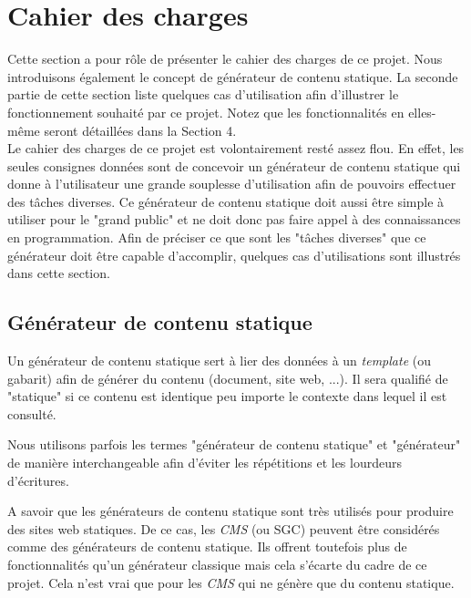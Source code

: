 \section{Cahier des charges}

	Cette section a pour rôle de présenter le cahier des charges de ce projet. Nous introduisons également le concept de générateur de contenu statique. La seconde partie de cette section liste quelques cas d'utilisation afin d'illustrer le fonctionnement souhaité par ce projet. Notez que les fonctionnalités en elles-même seront détaillées dans la Section 4.\\
	
	Le cahier des charges de ce projet est volontairement resté assez flou. En effet, les seules consignes données sont de concevoir un générateur de contenu statique qui donne à l'utilisateur une grande souplesse d'utilisation afin de pouvoirs effectuer des tâches diverses. Ce générateur de contenu statique doit aussi être simple à utiliser pour le "grand public" et ne doit donc pas faire appel à des connaissances en programmation. Afin de préciser ce que sont les "tâches diverses" que ce générateur doit être capable d'accomplir, quelques cas d'utilisations sont illustrés dans cette section.\\
	
	
	\subsection{Générateur de contenu statique}
	
		\begin{defn}
			Un générateur de contenu statique sert à lier des données à un \textit{template} (ou gabarit) afin de générer du contenu (document, site web, ...). Il sera qualifié de "statique" si ce contenu est identique peu importe le contexte dans lequel il est consulté.
		\end{defn}
		
		\begin{note}
			Nous utilisons parfois les termes "générateur de contenu statique" et "générateur" de manière interchangeable afin d'éviter les répétitions et les lourdeurs d'écritures.
		\end{note}
		
		 A savoir que les générateurs de contenu statique sont très utilisés pour produire des sites web statiques. De ce cas, les \textit{CMS} (ou SGC) peuvent être considérés comme des générateurs de contenu statique. Ils offrent toutefois plus de fonctionnalités qu'un générateur classique mais cela s'écarte du cadre de ce projet. Cela n'est vrai que pour les \textit{CMS} qui ne génère que du contenu statique.\\
		 
